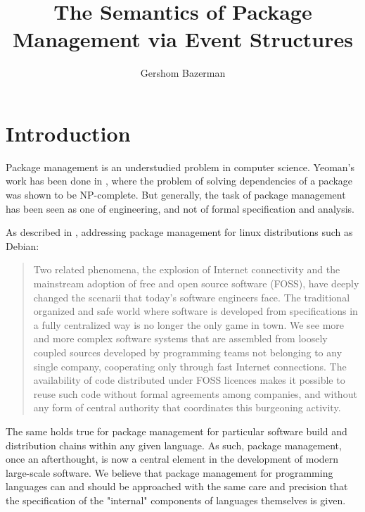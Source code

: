 \documentclass[hoptionsi,review,screen,format=sigconf]{acmart}
\title{The Semantics of Package Management via Event Structures}
\author{Gershom Bazerman}
\affiliation{%
   \institution{Awake Security}}
\theoremstyle{definition}
\begin{document}
\maketitle

\section{Introduction}
Package management is an understudied problem in computer science. Yeoman's work has been done in \cite{di2006edos, abate2012dependency}, where the problem of solving dependencies of a package was shown to be NP-complete. But generally, the task of package management has been seen as one of engineering, and not of formal specification and analysis. 

As described in \cite{abate2012dependency}, addressing package management for linux distributions such as Debian:
\begin{quotation}
Two related phenomena, the explosion of Internet connectivity and the mainstream adoption of free and open source software (FOSS), have deeply changed the scenarii that today’s software engineers face. The traditional organized and safe world where software is developed from specifications in a fully centralized way is no longer the only game in town. We see more and more complex software systems that are assembled from loosely coupled sources developed by programming teams not belonging to any single company, cooperating only through fast Internet connections. The availability of code distributed under FOSS licences makes it possible to reuse such code without formal agreements among companies, and without any form of central authority that coordinates this burgeoning activity.
\end{quotation}

The same holds true for package management for particular software build and distribution chains within any given language. As such, package management, once an afterthought, is now a central element in the development of modern large-scale software. We believe that package management for programming languages can and should be approached with the same care and precision that the specification of the "internal" components of languages themselves is given.
\end{document}
